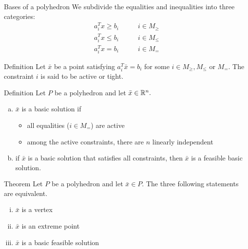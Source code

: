 \begin{frame}[allowframebreaks]{Bases of a polyhedron}
	We subdivide the equalities and inequalities into three categories:
	\begin{align*}
		a_i^T x \geq b_i \qquad & i\in M_{\geq}\\
		a_i^T x \leq b_i \qquad& i \in M_{\leq}\\
		a_i^T x = b_i \qquad& i \in M_{=}
	\end{align*}
	\begin{block}{Definition}
		Let  $\bar x$ be a point satisfying  $a_i^T \bar x = b_i$ for some  $i\in M_{\geq}, M_{\leq}$ or
		$M_=$. The constraint $i$ is said to be \alert{active} or \alert{tight}.
	\end{block}

	\begin{block}{Definition}
		Let  $P$ be a polyhedron and let $\bar x \in \mathbb{R}^n.$
		\begin{enumerate}[(a)]
			\item<1-> $\bar x$ is a \alert{basic solution} if 
			\begin{itemize}
				\item<1-> all equalities ($i\in M_=$) are \alert{active}
				\item<1-> among the active constraints, there are \alert{$n$ linearly 
					independent} 
			\end{itemize}
			\item<1-> if $\bar x$ is a basic solution  \alert{that satisfies all constraints}, then
			$\bar x$ is a \alert{feasible basic solution}.
		\end{enumerate}
	\end{block}
	\begin{block}{Theorem}
		Let  $P$ be a polyhedron and let  $\bar x \in P$. The three following statements are
		equivalent.
		\begin{enumerate}[(i)]
			\item $\bar x$ is a \alert{vertex}
			\item $\bar x$ is an \alert{extreme point}
			\item $\bar x$ is a \alert{basic feasible solution}
		\end{enumerate}
	\end{block}
\end{frame}

